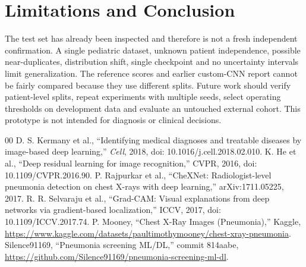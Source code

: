 \documentclass[conference]{IEEEtran}
\begin{document}
\section{Limitations and Conclusion}
The test set has already been inspected and therefore is not a fresh independent confirmation. A single pediatric dataset, unknown patient independence, possible near-duplicates, distribution shift, single checkpoint and no uncertainty intervals limit generalization. The reference scores and earlier custom-CNN report cannot be fairly compared because they use different splits. Future work should verify patient-level splits, repeat experiments with multiple seeds, select operating thresholds on development data and evaluate an untouched external cohort. This prototype is not intended for diagnosis or clinical decisions.
\begin{thebibliography}{00}
 D. S. Kermany et al., ``Identifying medical diagnoses and treatable diseases by image-based deep learning,'' \emph{Cell}, 2018, doi: 10.1016/j.cell.2018.02.010.
 K. He et al., ``Deep residual learning for image recognition,'' CVPR, 2016, doi: 10.1109/CVPR.2016.90.
 P. Rajpurkar et al., ``CheXNet: Radiologist-level pneumonia detection on chest X-rays with deep learning,'' arXiv:1711.05225, 2017.
 R. R. Selvaraju et al., ``Grad-CAM: Visual explanations from deep networks via gradient-based localization,'' ICCV, 2017, doi: 10.1109/ICCV.2017.74.
 P. Mooney, ``Chest X-Ray Images (Pneumonia),'' Kaggle, \url{https://www.kaggle.com/datasets/paultimothymooney/chest-xray-pneumonia}.
 Silence91169, ``Pneumonia screening ML/DL,'' commit 814aabe, \url{https://github.com/Silence91169/pneumonia-screening-ml-dl}.
\end{thebibliography}
\end{document}
